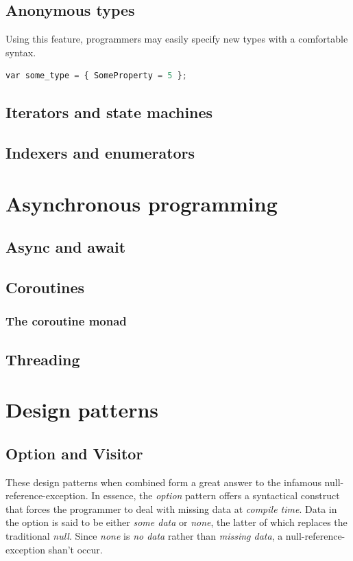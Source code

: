 \documentclass{article}
\begin{document}
\subsection{Anonymous types}
Using this feature, programmers may easily specify new types with a comfortable syntax.

\begin{lstlisting}[language=Python]
  var some_type = { SomeProperty = 5 };
\end{lstlisting}

\subsection{Iterators and state machines}


\subsection{Indexers and enumerators}

\newpage

\section{Asynchronous programming}
\subsection{Async and await}
\subsection{Coroutines}
\subsubsection{The coroutine monad}
\subsection{Threading}

\newpage

\section{Design patterns}

\subsection{Option and Visitor}
These design patterns when combined form a great answer to the infamous null-reference-exception.
In essence, the {\em option} pattern offers a syntactical construct that forces the programmer to deal with missing data at {\em compile time}.
Data in the option is said to be either {\em some data} or {\em none}, the latter of which replaces the traditional {\em null}.
Since {\em none} is {\em no data} rather than {\em missing data}, a null-reference-exception shan't occur.
\end{document}
